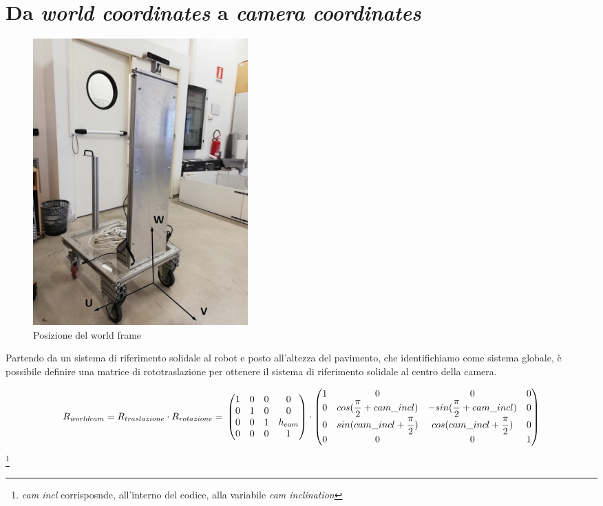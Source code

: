\section{Da \textit{world coordinates} a \textit{camera coordinates}}
\begin{figure}[H]
	\centering
	\includegraphics[width=0.4\textwidth]{Immagini/SupportoCamera_asse1.jpg}
	\caption{Posizione del world frame}
	\label{fig:worldframe}
\end{figure}

Partendo da un sistema di riferimento solidale al robot e posto all'altezza del pavimento, che identifichiamo come sistema globale, è possibile definire una matrice di rototraslazione per ottenere il sistema di riferimento solidale al centro della camera.

\begin{equation*}
R_{worldcam} = R_{traslazione} \cdot R_{rotazione} =\\
\begin{pmatrix}
1 & 0 & 0 & 0 \\
0 & 1 & 0 & 0 \\
0 & 0 & 1 & h_{cam} \\
0 & 0 & 0 & 1 \\
\end{pmatrix} \cdot
\begin{pmatrix}
1 & 0 & 0 & 0 \\
0 & cos(\dfrac{\pi}{2} + cam\_incl) & -sin(\dfrac{\pi}{2} + cam\_incl) & 0 \\
0 & sin(cam\_incl + \dfrac{\pi}{2}) & cos(cam\_incl + \dfrac{\pi}{2}) & 0 \\
0 & 0 & 0 & 1 \\
\end{pmatrix}
\end{equation*}
\footnote{\textit{cam incl} corrisposnde, all'interno del codice, alla variabile \textit{cam inclination}}

